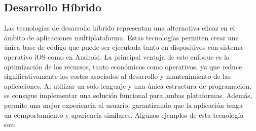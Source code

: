 \subsection{Desarrollo Híbrido}
\label{subsec:hibrido}
Las tecnologías de desarrollo híbrido representan una alternativa eficaz en el ámbito de aplicaciones multiplataforma. Estas tecnologías permiten crear una única 
base de código que puede ser ejecutada tanto en dispositivos con sistema operativo iOS como en Android. La principal ventaja de este enfoque es la optimización de los recursos,
tanto económicos como operativos, ya que reduce significativamente los costes asociados al desarrollo y mantenimiento de las aplicaciones. Al utilizar un solo lenguaje y una 
única estructura de programación, se consigue implementar una solución funcional para ambas plataformas. Además, permite una mejor experiencia al usuario, garantizando que la aplicación
tenga un comportamiento y apariencia similares. Algunos ejemplos de esta tecnología son:

